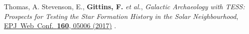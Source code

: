 \secstartswithlist{}%
\addtocounter{pubCounter}{-1}%
\begin{etaremune}[start=\value{pubCounter}]
    \renewcommand\labelenumi{[\theenumi]}
%
    \item Thomas, A. Stevenson, E., \textbf{Gittins, F.} \textit{et al.},
    \textit{Galactic Archaeology with TESS: Prospects for Testing the Star
    Formation History in the Solar Neighbourhood},
    \href{https://doi.org/10.1051/epjconf/201716005006}%
    {EPJ\ Web\ Conf.\ \textbf{160}, 05006 (2017)}
    .
\end{etaremune}



